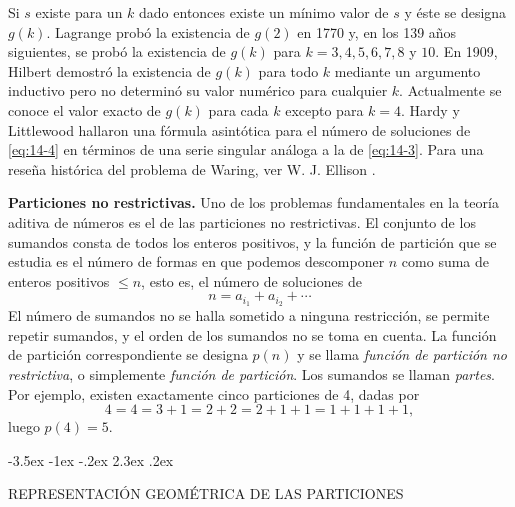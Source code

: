 \documentclass[12pt,a4paper]{book}
\makeatletter
\renewcommand\section{\@startsection{section}{1}{\z@}%
  {-3.5ex \@plus -1ex \@minus -.2ex}%
  {2.3ex \@plus .2ex}%
  {\normalfont\Large\bfseries\raggedright}}
\makeatother
\begin{document}
    Si $s$ existe para un $k$ dado entonces existe un mínimo valor de $s$ y éste se designa
    $g(k)$. Lagrange probó la existencia de $g(2)$ en 1770 y, en los 139 años siguientes, se
    probó la existencia de $g(k)$ para $k=3,4,5,6,7,8$ y $10$. En 1909, Hilbert demostró la
    existencia de $g(k)$ para todo $k$ mediante un argumento inductivo pero no determinó su
    valor numérico para cualquier $k$. Actualmente se conoce el valor exacto de $g(k)$ para
    cada $k$ excepto para $k=4$. Hardy y Littlewood hallaron una fórmula asintótica para el
    número de soluciones de \eqref{eq:14-4} en términos de una serie singular análoga a la de
    \eqref{eq:14-3}. Para una reseña histórica del problema de Waring, ver W. J. Ellison
    \cite{ellison1971}.

    \textbf{Particiones no restrictivas.} Uno de los problemas fundamentales en la teoría
    aditiva de números es el de las particiones no restrictivas. El conjunto de los sumandos
    consta de todos los enteros positivos, y la función de partición que se estudia es el número
    de formas en que podemos descomponer $n$ como suma de enteros positivos $\leq n$, esto es,
    el número de soluciones de
    \begin{equation}\label{eq:14-5}
        n=a_{i_{1}}+a_{i_{2}}+\cdots
    \end{equation}
    El número de sumandos no se halla sometido a ninguna restricción, se permite repetir
    sumandos, y el orden de los sumandos no se toma en cuenta. La función de partición
    correspondiente se designa $p(n)$ y se llama \textit{función de partición no restrictiva},
    o simplemente \textit{función de partición}. Los sumandos se llaman \textit{partes}. Por
    ejemplo, existen exactamente cinco particiones de 4, dadas por
    \begin{equation*}
        4=4=3+1=2+2=2+1+1=1+1+1+1,
    \end{equation*}
    luego $p(4)=5$.

    \section{REPRESENTACIÓN GEOMÉTRICA DE LAS PARTICIONES}
\end{document}
